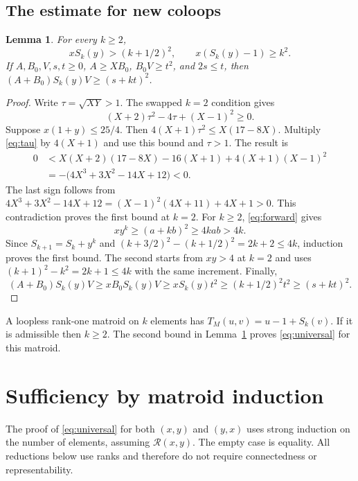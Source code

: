 \documentclass[11pt,a4paper]{article}
\newtheorem{lemma}[theorem]{Lemma}
\newcommand{\Reg}{\mathcal R}
\begin{document}
\subsection{The estimate for new coloops}
\begin{lemma}\label{lem:coloop-scalar}
For every $k\geq2$,
\[
xS_k(y)>(k+1/2)^2,\qquad x(S_k(y)-1)\geq k^2.
\]
If $A,B_0,V,s,t\geq0$, $A\geq XB_0$, $B_0V\geq t^2$, and $2s\leq t$,
then $(A+B_0)S_k(y)V\geq(s+kt)^2$.
\end{lemma}
\begin{proof}
Write $\tau=\sqrt{XY}>1$. The swapped $k=2$ condition gives
\begin{equation}\label{eq:tau}
(X+2)\tau^2-4\tau+(X-1)^2\geq0.
\end{equation}
Suppose $x(1+y)\leq25/4$. Then
$4(X+1)\tau^2\leq X(17-8X)$. Multiply \eqref{eq:tau} by $4(X+1)$
and use this bound and $\tau>1$. The result is
\begin{align*}
0&<X(X+2)(17-8X)-16(X+1)+4(X+1)(X-1)^2\\
 &=-\bigl(4X^3+3X^2-14X+12\bigr)<0.
\end{align*}
The last sign follows from
$4X^3+3X^2-14X+12=(X-1)^2(4X+11)+4X+1>0$.
This contradiction proves the first bound at $k=2$.
For $k\geq2$, \eqref{eq:forward} gives
\begin{equation}\label{eq:increment}
xy^k\geq(a+kb)^2\geq4kab>4k.
\end{equation}
Since $S_{k+1}=S_k+y^k$ and
$(k+3/2)^2-(k+1/2)^2=2k+2\leq4k$, induction proves the first bound.
The second starts from $xy>4$ at $k=2$ and uses
$(k+1)^2-k^2=2k+1\leq4k$ with the same increment.
Finally,
\[
(A+B_0)S_k(y)V\geq xB_0S_k(y)V
\geq xS_k(y)t^2\geq(k+1/2)^2t^2\geq(s+kt)^2.
\]
\end{proof}

A loopless rank-one matroid on $k$ elements has
$T_M(u,v)=u-1+S_k(v)$. If it is admissible then $k\geq2$.
The second bound in Lemma~\ref{lem:coloop-scalar} proves
\eqref{eq:universal} for this matroid.

\section{Sufficiency by matroid induction}

The proof of \eqref{eq:universal} for both $(x,y)$ and $(y,x)$ uses strong
induction on the number of elements, assuming $\Reg(x,y)$.
The empty case is equality. All reductions below use ranks and therefore
do not require connectedness or representability.
\end{document}
